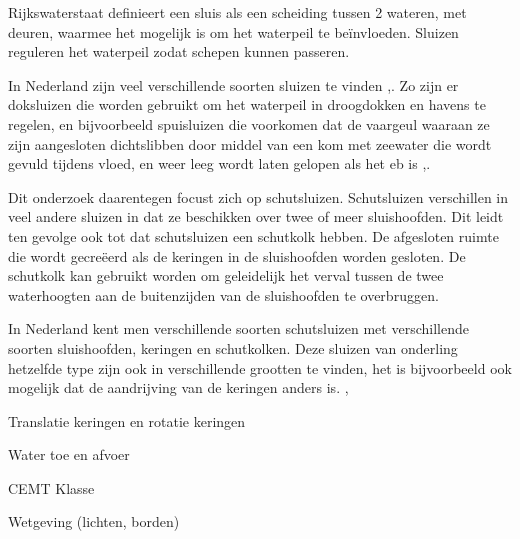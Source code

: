 \documentclass[../verslag.tex]{subfiles}
\begin{document}
Rijkswaterstaat definieert een sluis als een scheiding tussen 2 wateren, met deuren, waarmee het mogelijk is om het waterpeil te beïnvloeden. Sluizen reguleren het waterpeil zodat schepen kunnen passeren. \cite{rws_2022}

In Nederland zijn veel verschillende soorten sluizen te vinden \cite{wsnoorderzijlvest_2021},\cite{arends_1994}. Zo zijn er doksluizen die worden gebruikt om het waterpeil in droogdokken en havens te regelen, en bijvoorbeeld spuisluizen die voorkomen dat de vaargeul waaraan ze zijn aangesloten dichtslibben door middel van een kom met zeewater die wordt gevuld tijdens vloed, en weer leeg wordt laten gelopen als het eb is \cite{wsnoorderzijlvest_2021},\cite{arends_1994}.

Dit onderzoek daarentegen focust zich op schutsluizen. Schutsluizen verschillen in veel andere sluizen in dat ze beschikken over twee of meer sluishoofden. Dit leidt ten gevolge ook tot dat schutsluizen een schutkolk hebben. De afgesloten ruimte die wordt gecreëerd als de keringen in de sluishoofden worden gesloten. De schutkolk kan gebruikt worden om geleidelijk het verval tussen de twee waterhoogten aan de buitenzijden van de sluishoofden te overbruggen. \cite{bezuijen_2000}

In Nederland kent men verschillende soorten schutsluizen met verschillende soorten sluishoofden, keringen en schutkolken. Deze sluizen van onderling hetzelfde type zijn ook in verschillende grootten te vinden, het is bijvoorbeeld ook mogelijk dat de aandrijving van de keringen anders is. \cite{bezuijen_2000}, \cite{arends_1994}

Translatie keringen en rotatie keringen

Water toe en afvoer

CEMT Klasse

Wetgeving (lichten, borden)
\end{document}
